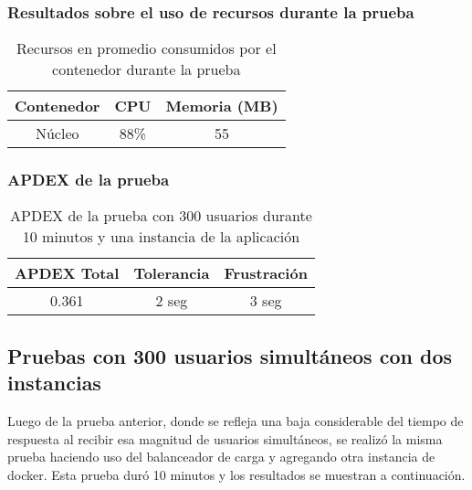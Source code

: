 \subsubsection{Resultados sobre el uso de recursos durante la prueba}
\begin{table}[!htbp]
    \centering
    \makegapedcells
    \begin{tabular}{|c|c|c|}
    \hline
    Contenedor & CPU & Memoria (MB)\\ \hline
    Núcleo & 88\% & 55 \\ \hline
    \end{tabular}
    \caption{Recursos en promedio consumidos por el contenedor durante la prueba}
    \label{tab:tabla_planes}
\end{table}

\subsubsection{APDEX de la prueba}
\begin{table}[!htbp]
    \centering
    \makegapedcells
    \begin{tabular}{|c|c|c|}
    \hline
    APDEX Total & Tolerancia & Frustración\\ \hline
    0.361 & 2 seg & 3 seg \\ \hline
    \end{tabular}
    \caption{APDEX de la prueba con 300 usuarios durante 10 minutos y una instancia de la aplicación}
    \label{tab:tabla_planes}
\end{table}


\subsection{Pruebas con 300 usuarios simultáneos con dos instancias}
Luego de la prueba anterior, donde se refleja una baja considerable del tiempo de respuesta al recibir esa magnitud de usuarios simultáneos, se realizó la misma prueba haciendo uso del balanceador de carga y agregando otra instancia de docker.
Esta prueba duró 10 minutos y los resultados se muestran a continuación.

